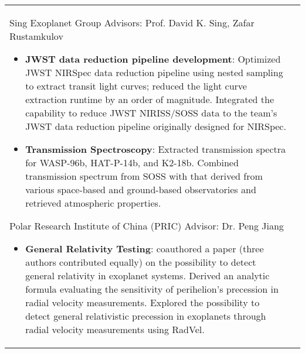 \documentclass[10pt]{article} %
\begin{document}
\begin{longtable}{L{4cm}@{\hskip 0.15in}L{13.5cm}}
{\begin{itemize}
\end{itemize}} %
{\normalsize Sing Exoplanet Group} %
{Advisors: Prof. David K. Sing, Zafar Rustamkulov} %
{\begin{itemize}
\vspace{-0.4cm}
    \item \textbf{JWST data reduction pipeline development}: Optimized JWST NIRSpec data reduction pipeline using nested sampling to extract transit light curves; reduced the light curve extraction runtime by an order of magnitude. Integrated the capability to reduce JWST NIRISS/SOSS data to the team's JWST data reduction pipeline originally designed for NIRSpec.
    \item \textbf{Transmission Spectroscopy}:  Extracted transmission spectra for WASP-96b, HAT-P-14b, and K2-18b. Combined transmission spectrum from SOSS with that derived from various space-based and ground-based observatories and retrieved atmospheric properties. 
\end{itemize}} %
\pagebreak
{} %
{\normalsize Polar Research Institute of China (PRIC)} %
{Advisor: Dr. Peng Jiang} %
{\begin{itemize}
\vspace{-0.4cm}
    \item \textbf{General Relativity Testing}: coauthored a paper (three authors contributed equally) on the possibility to detect general relativity in exoplanet systems. Derived an analytic formula evaluating the sensitivity of perihelion’s precession in radial velocity measurements. Explored the possibility to detect general relativistic precession in exoplanets through radial velocity measurements using RadVel.
\end{itemize}}
 




\end{longtable}
\end{document}
